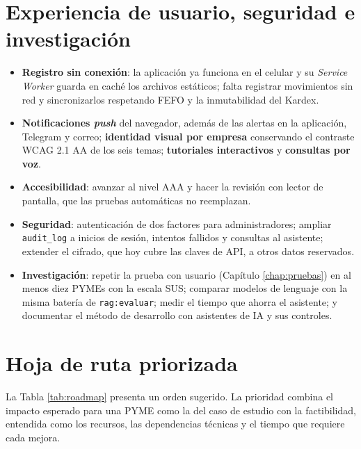 \section{Experiencia de usuario, seguridad e investigación}
\begin{itemize}
    \item \textbf{Registro sin conexión}: la aplicación ya funciona en el celular y su \textit{Service Worker} guarda en caché los archivos estáticos; falta registrar movimientos sin red y sincronizarlos respetando FEFO y la inmutabilidad del Kardex.
    \item \textbf{Notificaciones \textit{push}} del navegador, además de las alertas en la aplicación, Telegram y correo; \textbf{identidad visual por empresa} conservando el contraste WCAG 2.1 AA de los seis temas; \textbf{tutoriales interactivos} y \textbf{consultas por voz}.
    \item \textbf{Accesibilidad}: avanzar al nivel AAA y hacer la revisión con lector de pantalla, que las pruebas automáticas no reemplazan.
    \item \textbf{Seguridad}: autenticación de dos factores para administradores; ampliar \texttt{audit\_log} a inicios de sesión, intentos fallidos y consultas al asistente; extender el cifrado, que hoy cubre las claves de API, a otros datos reservados.
    \item \textbf{Investigación}: repetir la prueba con usuario (Capítulo \ref{chap:pruebas}) en al menos diez PYMEs con la escala SUS; comparar modelos de lenguaje con la misma batería de \texttt{rag:evaluar}; medir el tiempo que ahorra el asistente; y documentar el método de desarrollo con asistentes de IA y sus controles.
\end{itemize}

\section{Hoja de ruta priorizada}

La Tabla \ref{tab:roadmap} presenta un orden sugerido. La prioridad combina el impacto esperado para una PYME como la del caso de estudio con la factibilidad, entendida como los recursos, las dependencias técnicas y el tiempo que requiere cada mejora.

